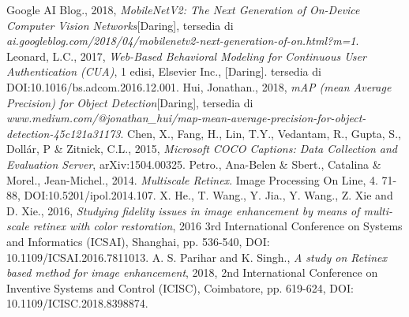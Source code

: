 \documentclass{tesisilkomugm}
\begin{document}
\begin{thebibliography}{99}
Google AI Blog., 2018, \emph{MobileNetV2: The Next Generation of On-Device Computer Vision Networks}[Daring], tersedia di \emph{ai.googleblog.com/2018/04/mobilenetv2-next-generation-of-on.html?m=1}.
Leonard, L.C., 2017, \emph{Web-Based Behavioral Modeling for Continuous User 
	Authentication (CUA)}, 1 edisi, Elsevier Inc., [Daring]. tersedia di 
DOI:10.1016/bs.adcom.2016.12.001.
Hui, Jonathan., 2018, \emph{mAP (mean Average Precision) for Object Detection}[Daring], tersedia di \emph{www.medium.com/@jonathan\_hui/map-mean-average-precision-for-object-detection-45c121a31173}.
Chen, X., Fang, H., Lin, T.Y., Vedantam, R., Gupta, S., Dollár, P \& Zitnick, C.L., 2015, \emph{Microsoft COCO Captions: Data Collection and Evaluation Server}, arXiv:1504.00325.
Petro., Ana-Belen \& Sbert., Catalina \& Morel., Jean-Michel., 2014. \emph{Multiscale Retinex}. Image Processing On Line, 4. 71-88, DOI:10.5201/ipol.2014.107. 
X. He., T. Wang., Y. Jia., Y. Wang., Z. Xie and D. Xie., 2016, \emph{Studying fidelity issues in image enhancement by means of multi-scale retinex with color restoration}, 2016 3rd International Conference on Systems and Informatics (ICSAI), Shanghai, pp. 536-540, DOI: 10.1109/ICSAI.2016.7811013.
A. S. Parihar and K. Singh., \emph{A study on Retinex based method for image enhancement}, 2018, 2nd International Conference on Inventive Systems and Control (ICISC), Coimbatore, pp. 619-624, DOI: 10.1109/ICISC.2018.8398874.
\end{thebibliography}



\appendix


\end{document}
